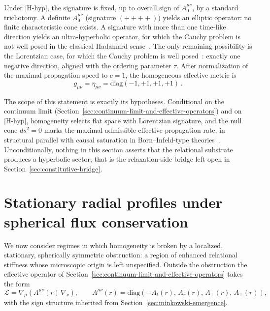 \documentclass[epj]{svjour}
\begin{document}
  Under [H-hyp], the signature is fixed, up to overall sign of $A^{\mu\nu}_0$, by a standard
  trichotomy.
  A definite $A^{\mu\nu}_0$ (signature $(++++)$) yields an elliptic operator: no finite
  characteristic cone exists.
  A signature with more than one time-like direction yields an ultra-hyperbolic operator, for which
  the Cauchy problem is not well posed in the classical Hadamard sense~\cite{HormanderPDE}.
  The only remaining possibility is the Lorentzian case, for which the Cauchy problem is well
  posed~\cite{ChoquetBruhat2009}: exactly one negative direction, aligned with the ordering
  parameter $\tau$.
  After normalization of the maximal propagation speed to $c = 1$, the homogeneous effective metric
  is
  \begin{equation}
    g_{\mu\nu} = \eta_{\mu\nu} = \mathrm{diag}(-1, +1, +1, +1)\,.
    \label{eq:minkowski}
  \end{equation}

  The scope of this statement is exactly its hypotheses.
  Conditional on the continuum limit
  (Section~\ref{sec:continuum-limit-and-effective-operators}) and on [H-hyp], homogeneity selects
  flat space with Lorentzian signature, and the null cone $ds^2 = 0$ marks the maximal admissible
  effective propagation rate, in structural parallel with causal saturation in Born--Infeld-type
  theories~\cite{Boillat1970,Gibbons1998}.
  Unconditionally, nothing in this section asserts that the relational substrate produces a
  hyperbolic sector; that is the relaxation-side bridge left open in
  Section~\ref{sec:constitutive-bridge}.

  \section{Stationary radial profiles under spherical flux conservation}
  \label{sec:localized-obstruction-and-schwarzschild-geometry}

  We now consider regimes in which homogeneity is broken by a localized, stationary, spherically
  symmetric obstruction: a region of enhanced relational stiffness whose microscopic origin is left
  unspecified.
  Outside the obstruction the effective operator of
  Section~\ref{sec:continuum-limit-and-effective-operators} takes the form
  \begin{equation}
    \mathcal{L}
    = \nabla_\mu \!\left( A^{\mu\nu}(r)\,\nabla_\nu \right),
    \qquad
    A^{\mu\nu}(r) =
    \mathrm{diag}\!\left(-A_t(r),\,A_r(r),\,A_\perp(r),\,A_\perp(r)\right),
    \label{eq:radial-operator}
  \end{equation}
  with the sign structure inherited from Section~\ref{sec:minkowski-emergence}.
\end{document}
